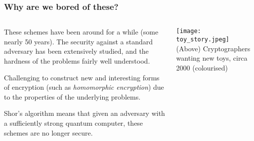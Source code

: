 \documentclass[
aspectratio=169, %
t, %
onlytextwidth, %
10pt, %
]{beamer}
\begin{document}

\begin{frame}
    \frametitle{Why are we bored of these?}
    \begin{columns}[T] %
        \begin{column}{0.48\linewidth} %
            These schemes have been around for a while (some nearly 50 years). The security against a standard adversary has been extensively studied, and the hardness of the problems fairly well understood.

            Challenging to construct new and interesting forms of encryption (such as \textit{homomorphic encryption}) due to the properties of the underlying problems.

            Shor's algorithm means that given an adversary with a sufficiently strong quantum computer, these schemes are no longer secure.
        \end{column}
        \begin{column}{0.48\linewidth} %
            \texttt{[image: toy\_story.jpeg]} %
            {\tiny\textcolor{ICLBlue}{(Above) Cryptographers wanting new toys, circa 2000 (colourised)}}
        \end{column}
    \end{columns}
\end{frame}

\end{document}
